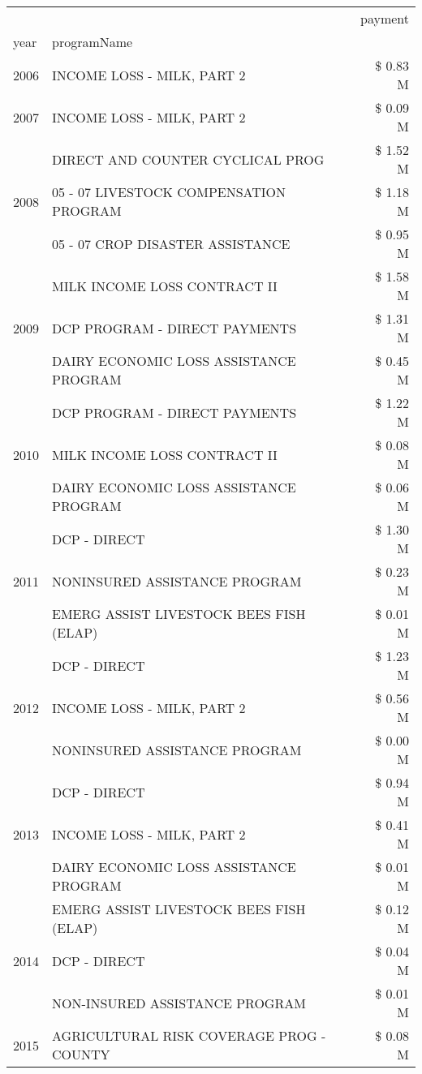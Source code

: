 \begin{tabular}{llr}
\toprule
 &  & payment \\
year & programName &  \\
\midrule
2006 & INCOME LOSS - MILK, PART 2 & \$ 0.83 M \\
\cline{1-3}
2007 & INCOME LOSS - MILK, PART 2 & \$ 0.09 M \\
\cline{1-3}
\multirow[t]{3}{*}{2008} & DIRECT AND COUNTER CYCLICAL PROG & \$ 1.52 M \\
 & 05 - 07 LIVESTOCK COMPENSATION PROGRAM & \$ 1.18 M \\
 & 05 - 07 CROP DISASTER ASSISTANCE & \$ 0.95 M \\
\cline{1-3}
\multirow[t]{3}{*}{2009} & MILK INCOME LOSS CONTRACT II & \$ 1.58 M \\
 & DCP PROGRAM - DIRECT PAYMENTS & \$ 1.31 M \\
 & DAIRY ECONOMIC LOSS ASSISTANCE PROGRAM & \$ 0.45 M \\
\cline{1-3}
\multirow[t]{3}{*}{2010} & DCP PROGRAM - DIRECT PAYMENTS & \$ 1.22 M \\
 & MILK INCOME LOSS CONTRACT II & \$ 0.08 M \\
 & DAIRY ECONOMIC LOSS ASSISTANCE PROGRAM & \$ 0.06 M \\
\cline{1-3}
\multirow[t]{3}{*}{2011} & DCP - DIRECT & \$ 1.30 M \\
 & NONINSURED ASSISTANCE PROGRAM & \$ 0.23 M \\
 & EMERG ASSIST LIVESTOCK BEES FISH (ELAP) & \$ 0.01 M \\
\cline{1-3}
\multirow[t]{3}{*}{2012} & DCP - DIRECT & \$ 1.23 M \\
 & INCOME LOSS - MILK, PART 2 & \$ 0.56 M \\
 & NONINSURED ASSISTANCE PROGRAM & \$ 0.00 M \\
\cline{1-3}
\multirow[t]{3}{*}{2013} & DCP - DIRECT & \$ 0.94 M \\
 & INCOME LOSS - MILK, PART 2 & \$ 0.41 M \\
 & DAIRY ECONOMIC LOSS ASSISTANCE PROGRAM & \$ 0.01 M \\
\cline{1-3}
\multirow[t]{3}{*}{2014} & EMERG ASSIST LIVESTOCK BEES FISH (ELAP) & \$ 0.12 M \\
 & DCP - DIRECT & \$ 0.04 M \\
 & NON-INSURED ASSISTANCE PROGRAM & \$ 0.01 M \\
\cline{1-3}
2015 & AGRICULTURAL RISK COVERAGE PROG - COUNTY & \$ 0.08 M \\
\cline{1-3}

\end{tabular}
